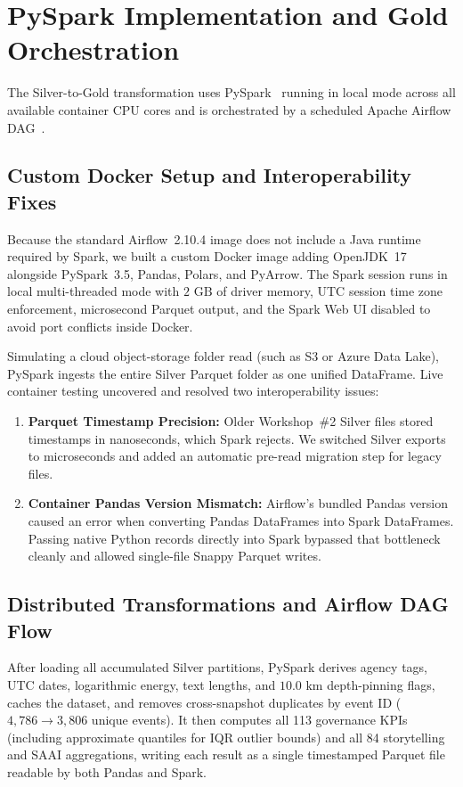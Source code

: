 \section{PySpark Implementation and Gold Orchestration}

The Silver-to-Gold transformation uses PySpark~\cite{pyspark_docs} running in local mode across all available container CPU cores and is orchestrated by a scheduled Apache Airflow DAG~\cite{airflow_docs}.

\subsection{Custom Docker Setup and Interoperability Fixes}
Because the standard Airflow~2.10.4 image does not include a Java runtime required by Spark, we built a custom Docker image adding OpenJDK~17 alongside PySpark~3.5, Pandas, Polars, and PyArrow. The Spark session runs in local multi-threaded mode with $2\text{ GB}$ of driver memory, UTC session time zone enforcement, microsecond Parquet output, and the Spark Web UI disabled to avoid port conflicts inside Docker.

Simulating a cloud object-storage folder read (such as S3 or Azure Data Lake), PySpark ingests the entire Silver Parquet folder as one unified DataFrame. Live container testing uncovered and resolved two interoperability issues:
\begin{enumerate}
    \item \textbf{Parquet Timestamp Precision:} Older Workshop~\#2 Silver files stored timestamps in nanoseconds, which Spark rejects. We switched Silver exports to microseconds and added an automatic pre-read migration step for legacy files.
    \item \textbf{Container Pandas Version Mismatch:} Airflow's bundled Pandas version caused an error when converting Pandas DataFrames into Spark DataFrames. Passing native Python records directly into Spark bypassed that bottleneck cleanly and allowed single-file Snappy Parquet writes.
\end{enumerate}

\subsection{Distributed Transformations and Airflow DAG Flow}
After loading all accumulated Silver partitions, PySpark derives agency tags, UTC dates, logarithmic energy, text lengths, and $10.0\text{ km}$ depth-pinning flags, caches the dataset, and removes cross-snapshot duplicates by event ID ($4,786 \to 3,806$ unique events). It then computes all 113 governance KPIs (including approximate quantiles for IQR outlier bounds) and all 84 storytelling and SAAI aggregations, writing each result as a single timestamped Parquet file readable by both Pandas and Spark.

